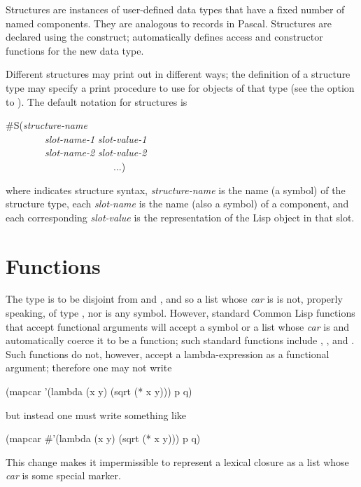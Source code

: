 Structures are instances of user-defined data types that have
a fixed number of named components.  They are analogous to
records in Pascal.
Structures are declared using the  construct;
 automatically defines access and constructor functions for
the new data type.

Different structures may print out in different ways;
the definition of a structure type may specify a print procedure
to use for objects of that type (see the
 option to ).
The default notation for structures is
\begin{lisp}
\#S(\emph{structure-name} \\
~~~~~~~~\emph{slot-name-1} \emph{slot-value-1} \\
~~~~~~~~\emph{slot-name-2} \emph{slot-value-2} \\
~~~~~~~~~~~~~~~~~~~~~~...)
\end{lisp}
where  indicates structure syntax, \emph{structure-name} is
the name (a symbol) of the structure type, each \emph{slot-name} is the name
(also a symbol) of a component, and each corresponding \emph{slot-value}
is the representation of the Lisp object in that slot.

\section{Functions}
\label{FUNCTION-TYPE-SECTION}

The type  is to be disjoint
from  and , and so a list whose \emph{car} is 
is not, properly speaking, of type , nor is any symbol.
However,
standard Common Lisp functions that accept functional arguments
will accept a symbol or a list whose \emph{car} is 
and automatically coerce it to be a function; such standard
functions include , , and .
Such functions do not, however, accept a lambda-expression as a functional
argument; therefore one may not write

\vskip 3pt
\begin{lisp}
(mapcar '(lambda (x y) (sqrt (* x y))) p q)
\end{lisp}
but instead one must write something like
\begin{lisp}
(mapcar \#'(lambda (x y) (sqrt (* x y))) p q)
\end{lisp}

This change makes it impermissible to represent a lexical closure
as a list whose \emph{car} is some special marker.

